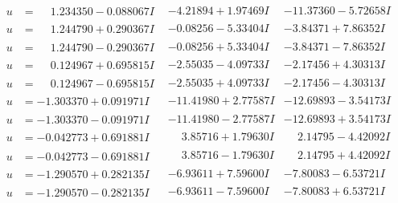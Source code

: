 \documentclass[1p]{elsarticle_modified}
\theoremstyle{definition}
\begin{document}
$$\begin{array}{c|c|c}
\begin{aligned}
u &= \phantom{-}1.234350 - 0.088067 I\end{aligned}
 & -4.21894 + 1.97469 I & -11.37360 - 5.72658 I \\ \hline\begin{aligned}
u &= \phantom{-}1.244790 + 0.290367 I\end{aligned}
 & -0.08256 - 5.33404 I & -3.84371 + 7.86352 I \\ \hline\begin{aligned}
u &= \phantom{-}1.244790 - 0.290367 I\end{aligned}
 & -0.08256 + 5.33404 I & -3.84371 - 7.86352 I \\ \hline\begin{aligned}
u &= \phantom{-}0.124967 + 0.695815 I\end{aligned}
 & -2.55035 - 4.09733 I & -2.17456 + 4.30313 I \\ \hline\begin{aligned}
u &= \phantom{-}0.124967 - 0.695815 I\end{aligned}
 & -2.55035 + 4.09733 I & -2.17456 - 4.30313 I \\ \hline\begin{aligned}
u &= -1.303370 + 0.091971 I\end{aligned}
 & -11.41980 + 2.77587 I & -12.69893 - 3.54173 I \\ \hline\begin{aligned}
u &= -1.303370 - 0.091971 I\end{aligned}
 & -11.41980 - 2.77587 I & -12.69893 + 3.54173 I \\ \hline\begin{aligned}
u &= -0.042773 + 0.691881 I\end{aligned}
 & \phantom{-}3.85716 + 1.79630 I & \phantom{-}2.14795 - 4.42092 I \\ \hline\begin{aligned}
u &= -0.042773 - 0.691881 I\end{aligned}
 & \phantom{-}3.85716 - 1.79630 I & \phantom{-}2.14795 + 4.42092 I \\ \hline\begin{aligned}
u &= -1.290570 + 0.282135 I\end{aligned}
 & -6.93611 + 7.59600 I & -7.80083 - 6.53721 I \\ \hline\begin{aligned}
u &= -1.290570 - 0.282135 I\end{aligned}
 & -6.93611 - 7.59600 I & -7.80083 + 6.53721 I \\ \hline\begin{aligned}

\end{aligned}
\end{array}$$
\end{document}

